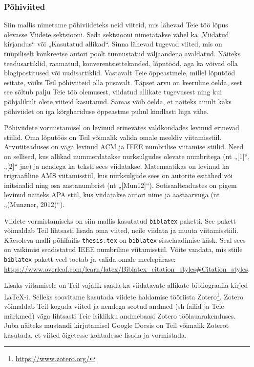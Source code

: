 \subsubsection{Põhiviited}
Siin mallis nimetame põhiviideteks neid viiteid, mis lähevad Teie töö lõpus olevasse Viidete sektsiooni. Seda sektsiooni nimetatakse vahel ka „Viidatud kirjandus“ või „Kasutatud allikad“. Sinna lähevad tugevad viited, mis on tüüpiliselt konkreetse autori poolt tunnustatud väljaandena avaldatud. Näiteks teadusartiklid, raamatud, konverentsiettekanded, lõputööd, aga ka võivad olla blogipostitused või uudisartiklid. Vastavalt Teie õppeastmele, millel lõputööd esitate, võiks Teil põhiviiteid olla piisavalt. Täpset arvu on keeruline öelda, sest see sõltub palju Teie töö olemusest, viidatud allikate tugevusest ning kui põhjalikult olete viiteid kasutanud. Samas võib öelda, et näiteks ainult kaks põhiviidet on iga kõrghariduse õppeastme puhul kindlasti liiga vähe.

Põhiviidete vormistamisel on levinud erinevates valdkondades levinud erinevad stiilid. Oma lõputöös on Teil võimalik valida omale meeldiv viitamisstiil. Arvutiteaduses on väga levinud ACM ja IEEE numbrilise viitamise stiilid. Need on sellised, kus allikad nummerdatakse nurksulgudes olevate numbritega (nt „[1]“, „[2]“ jne) ja nendega ka teksti sees viidatakse. Matemaatikas on levinud ka trigraafiline AMS viitamisstiil, kus nurksulgude sees on autorite esitähed või initsiaalid ning osa aastanumbrist (nt „[Mun12]“). Sotisaalteadustes on pigem levinud näiteks APA stiil, kus viidatakse autori nime ja aastaarvuga (nt „(Munzner, 2012)“).

Viidete vormistamiseks on siin mallis kasutatud \verb|biblatex| paketti. See pakett võimaldab Teil lihtsasti lisada oma viited, neile viidata ja muuta viitamisstiili. Käesoleva malli põhifailis \verb|thesis.tex| on \verb|biblatex| sisselaadimise käsk. Seal sees on vaikimisi seadistatud IEEE numbriline viitamisstiil. Võite vaadata, mis stiile \verb|biblatex| pakett veel toetab ja valida omale meelepärase: \url{https://www.overleaf.com/learn/latex/Biblatex_citation_styles\#Citation_styles}.

Lisaks viitamisele on Teil vajalik saada ka viidatavate allikate bibliograafia kirjed LaTeX-i. Selleks soovitame kasutada viidete haldamise tööriista Zotero\footnote{\url{https://www.zotero.org/}}. Zotero võimaldab Teil koguda viited ja nendega seotud andmed (sh failid ja Teie märkmed) väga lihtsasti Teie isiklikku andmebaasi Zotero töölauarakenduses. Juba näiteks mustandi kirjutamisel Google Docsis on Teil võimalik Zoterot kasutada, et viited õigetesse kohtadesse lisada ja vormistada.

